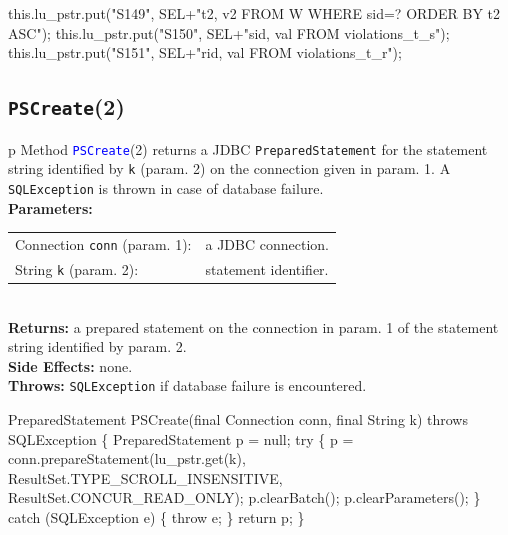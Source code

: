 this.lu_pstr.put("S149", SEL+"t2, v2 FROM W WHERE sid=? ORDER BY t2 ASC");
\eatline
{}\nwendcode{}\endmoddef{}
this.lu_pstr.put("S150", SEL+"sid, val FROM violations_t_s");
\eatline
{}\nwendcode{}\endmoddef{}
this.lu_pstr.put("S151", SEL+"rid, val FROM violations_t_r");
\eatline
{}\nwendcode{}\nwdocspar
\subsection{\texttt{PSCreate}(2)}
\begin{tabular}{p{\textwidth}}
\toprule
{}
Method \textcolor{blue}{{\tt{}\protect{}PSCreate}}(2) returns a JDBC {\tt{}PreparedStatement} for the
statement string identified by {\tt{}k} (param. 2) on the connection given in
param. 1.  A {\tt{}SQLException} is thrown in case of database failure.\\
\midrule
\textbf{Parameters:} \\
\begin{tabular}{lp{116mm}}
Connection {\tt{}conn} (param. 1):&a JDBC connection.\\
String {\tt{}k} (param. 2):&statement identifier.\\
\end{tabular}\\
\textbf{Returns:} a prepared statement on the connection in param. 1 of the
statement string identified by param. 2.\\
\textbf{Side Effects:} none.\\
\textbf{Throws:} {\tt{}SQLException} if database failure is encountered.\\
\bottomrule
\end{tabular}
\nwenddocs{}\endmoddef{}
PreparedStatement PSCreate(final Connection conn, final String k) throws SQLException \{
  PreparedStatement p = null;
  try \{
    p = conn.prepareStatement(lu_pstr.get(k),
      ResultSet.TYPE_SCROLL_INSENSITIVE, ResultSet.CONCUR_READ_ONLY);
    p.clearBatch();
    p.clearParameters();
  \} catch (SQLException e) \{
    throw e;
  \}
  return p;
\}
\eatline
{}\nwendcode{}\nwdocspar
